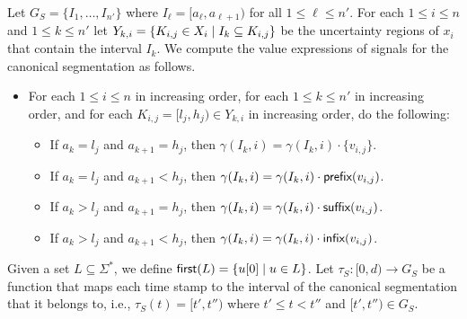 Let $G_S = \{I_1, \ldots, I_{n'}\}$ where $I_\ell = [a_\ell, a_{\ell+1})$ for all $1 \leq \ell \leq n'$.
For each $1 \leq i \leq n$ and $1 \leq k \leq n'$ let $Y_{k,i} = \{ K_{i,j} \in X_i \st I_k \subseteq K_{i,j}\}$ be the uncertainty regions of $x_i$ that contain the interval $I_k$.
We compute the value expressions of signals for the canonical segmentation as follows.
\begin{itemize}
	\item For each $1 \leq i \leq n$ in increasing order, for each $1 \leq k \leq n'$ in increasing order, and for each $K_{i,j} = [l_j, h_j) \in Y_{k,i}$ in increasing order, do the following:
	\begin{itemize}
		\item If $a_k = l_j$ and $a_{k+1} = h_j$, then $\gamma(I_k, i) = \gamma(I_k, i) \cdot \{v_{i,j}\}$.
		\item If $a_k = l_j$ and $a_{k+1}  < h_j$, then $\gamma(I_k, i) = \gamma(I_k, i) \cdot \textsf{prefix}(v_{i,j})$.
		\item If $a_k > l_j$ and $a_{k+1}  = h_j$, then $\gamma(I_k, i) = \gamma(I_k, i) \cdot \textsf{suffix}(v_{i,j})$.
		\item If $a_k > l_j$ and $a_{k+1}  < h_j$, then $\gamma(I_k, i) = \gamma(I_k, i) \cdot \textsf{infix}(v_{i,j})$.
	\end{itemize}
\end{itemize}


Given a set $L \subseteq \Sigma^*$, we define $\first(L) = \{ u[0] \st u \in L\}$.
Let $\tau_S : [0,d) \to G_S$ be a function that maps each time stamp to the interval of the canonical segmentation that it belongs to, i.e., $\tau_S(t) = [t', t'')$ where $t' \leq t < t''$ and $[t', t'') \in G_S$.

